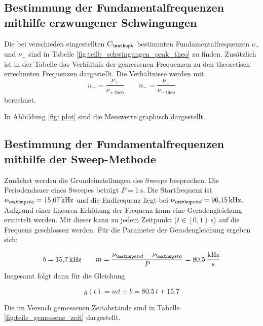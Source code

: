 %


\subsection{Bestimmung der Fundamentalfrequenzen mithilfe erzwungener Schwingungen}
Die bei verschieden eingestellten $C\ua{k}$ bestimmten Fundamentalfrequenzen
$\nu_+$ und $\nu_-$
sind in Tabelle \ref{fig:teilb_schwingungen_prak_theo} zu finden.
Zusätzlich ist in der Tabelle das Verhältnis der gemessenen Frequenzen
zu den theoretisch errechneten Frequenzen dargestellt.
Die Verhältnisse werden mit
\begin{equation}
\label{eq:verh}
n_+=\frac{\nu_+}{\nu_{+\,\mathup{theo}}} \qquad n_-=\frac{\nu_-}{\nu_{-\,\mathup{theo}}}
\end{equation}
berechnet.
\FloatBarrier

\FloatBarrier
In Abbildung \ref{fig: plot} sind die Messwerte graphisch dargestellt. %

\subsection{Bestimmung der Fundamentalfrequenzen mithilfe der Sweep-Methode}
Zunächst werden die Grundeinstellungen des Sweeps besprochen.
Die Periodendauer eines Sweepes beträgt $P=\SI{1}{\second}$.
Die Startfrequenz ist $\nu\ua{sta}=\SI{15.67}{\kilo\hertz}$ und die
Endfrequenz liegt bei $\nu\ua{end}=\SI{96.15}{\kilo\hertz}$.
Aufgrund einer linearen Erhöhung der Frequenz kann eine Geradengleichung ermittelt werden.
Mit dieser kann zu jedem Zeitpunkt ($t\in\left[0,1\right)\,\si{\second}$) auf die Frequenz geschlossen werden.
Für die Parameter der Geradengleichung ergeben sich:

\begin{equation*}
b=\SI{15.7}{\kilo\hertz} \qquad m=\frac{\nu\ua{end}-\nu\ua{sta}}{P}=\SI{80.5}{\kilo\hertz\per\second}
\end{equation*}
Insgesamt folgt dann für die Gleichung %

\begin{equation}
\label{eq:geraden}
g(t)=mt+b=80.5\,t+15.7
\end{equation}

Die im Versuch gemessenen Zeitabstände sind in Tabelle \ref{fig:teilc_gemessene_zeit} dargestellt.


